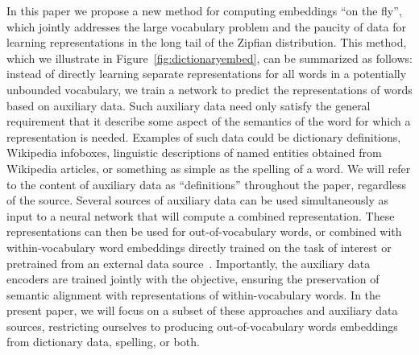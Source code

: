 In this paper we propose a new method for computing embeddings ``on the fly'', which jointly addresses the large vocabulary problem and the paucity of data for learning representations in the long tail of the Zipfian distribution. This method, which we illustrate in Figure~\ref{fig:dictionaryembed}, can be summarized as follows: instead of directly learning separate representations for all words in a potentially unbounded vocabulary, we train a network to predict the representations of words based on auxiliary data. Such auxiliary data need only satisfy the general requirement that it describe some aspect of the semantics of the word for which a representation is needed. Examples of such data could be dictionary definitions, Wikipedia infoboxes, linguistic descriptions of named entities obtained from Wikipedia articles, or something as simple as the spelling of a word. We will refer to the content of auxiliary data as ``definitions'' throughout the paper, regardless of the source. Several sources of auxiliary data can be used simultaneously as input to a neural network that will compute a combined  representation. These representations can then be used for out-of-vocabulary words, or combined with within-vocabulary word embeddings directly trained on the task of interest or pretrained from an external data source~\citep{mikolov2013distributed,pennington2014glove}. Importantly, the auxiliary data encoders are trained jointly with the objective, ensuring the preservation of semantic alignment with representations of within-vocabulary words. In the present paper, we will focus on a subset of these approaches and auxiliary data sources, restricting ourselves to producing out-of-vocabulary words embeddings from dictionary data, spelling, or both. 



